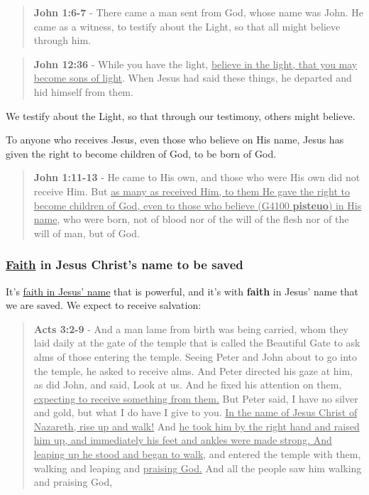 \documentclass[11pt]{article}
\begin{document}
\begin{quote}
\textbf{John 1:6-7} - There came a man sent from God, whose name was John. He came as a witness, to testify about the Light, so that all might believe through him.
\end{quote}

\begin{quote}
\textbf{John 12:36} - While you have the light, \uline{believe in the light, that you may become sons of light}. When Jesus had said these things, he departed and hid himself from them.
\end{quote}

We testify about the Light, so that through our testimony, others might believe.

To anyone who receives Jesus, even those who believe on His name, Jesus has given the right to become children of God, to be born of God.

\begin{quote}
\textbf{John 1:11-13} - He came to His own, and those who were His own did not receive Him. But \uline{as many as received Him, to them He gave the right to become children of God, even to those who believe (G4100 \textbf{pisteuo}) in His name}, who were born, not of blood nor of the will of the flesh nor of the will of man, but of God.
\end{quote}

\subsubsection{\underline{Faith} in Jesus Christ's name to be saved}
\label{sec:org0b537aa}
It's \uline{faith in Jesus' name} that is powerful, and it's with \textbf{faith} in Jesus' name that we are saved. We expect to receive salvation:

\begin{quote}
\textbf{Acts 3:2-9} - And a man lame from birth was being carried, whom they laid daily at the gate of the temple that is called the Beautiful Gate to ask alms of those entering the temple. Seeing Peter and John about to go into the temple, he asked to receive alms. And Peter directed his gaze at him, as did John, and said, Look at us. And he fixed his attention on them, \uline{expecting to receive something from them.} But Peter said, I have no silver and gold, but what I do have I give to you. \uline{In the name of Jesus Christ of Nazareth, rise up and walk!} And \uline{he took him by the right hand and raised him up, and immediately his feet and ankles were made strong. And leaping up he stood and began to walk}, and entered the temple with them, walking and leaping and \uline{praising God.} And all the people saw him walking and praising God,
\end{quote}
\end{document}
